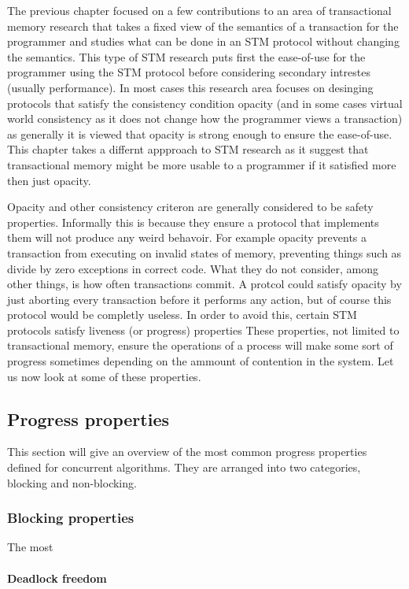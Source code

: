 The previous chapter focused on a few contributions to an area of transactional
memory research that takes a fixed view of the semantics of a transaction for the programmer
and studies what can be done in an STM protocol without changing the semantics.
This type of STM research puts first the ease-of-use for the programmer using the STM protocol
before considering secondary intrestes (usually performance).
In most cases this research area focuses on desinging protocols that satisfy the consistency
condition opacity (and in some cases virtual world consistency as it does not change
how the programmer views a transaction) as generally it is viewed that opacity is strong enough
to ensure the ease-of-use.
This chapter takes a differnt appproach to STM research as it suggest that transactional
memory might be more usable to a programmer if it satisfied more then just opacity.

Opacity and other consistency criteron are generally considered to be safety properties.
Informally this is because they ensure a protocol that implements them will not produce any weird behavoir.
For example opacity prevents a transaction from executing on invalid states of memory, preventing
things such as divide by zero exceptions in correct code.
What they do not consider, among other things, is how often transactions commit.
A protcol could satisfy opacity by just aborting every transaction before it performs
any action, but of course this protocol would be completly useless.
In order to avoid this, certain STM protocols satisfy liveness (or progress) properties
These properties, not limited to transactional memory, ensure the operations of a process
will make some sort of progress sometimes depending on the ammount of contention in the system.
Let us now look at some of these properties.

\subsection{Progress properties}
This section will give an overview of the most common progress properties defined
for concurrent algorithms.
They are arranged into two categories, blocking and non-blocking.

\subsubsection{Blocking properties}
The most 

\paragraph{Deadlock freedom}
